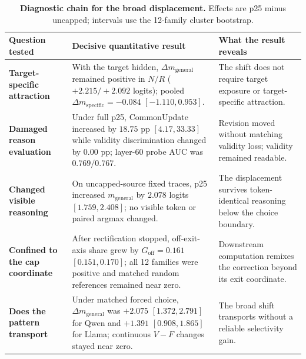 \documentclass[letterpaper]{article} %
\begin{document}
\begin{table}[t]
\centering
\small
\setlength{\tabcolsep}{4pt}
\renewcommand{\arraystretch}{1.12}
\begin{tabular}{@{}L{0.20\textwidth}L{0.38\textwidth}L{0.34\textwidth}@{}}
\toprule
Question tested & Decisive quantitative result & What the result reveals \\
\midrule

\textbf{Target-specific}\newline
\textbf{attraction}
&
With the target hidden, $\Delta m_{\mathrm{general}}$ remained positive in
$N/R$ ($+2.215/+2.092$ logits); pooled
$\Delta m_{\mathrm{specific}}=-0.084$ $[-1.110,0.953]$.
&
The shift does not require target exposure or target-specific attraction.
\\

\addlinespace

\textbf{Damaged reason}\newline
\textbf{evaluation}
&
Under full p25, CommonUpdate increased by $18.75$ pp
$[4.17,33.33]$ while validity discrimination changed by $0.00$ pp;
layer-60 probe AUC was $0.769/0.767$.
&
Revision moved without matching validity loss; validity remained readable.
\\

\addlinespace

\textbf{Changed visible}\newline
\textbf{reasoning}
&
On uncapped-source fixed traces, p25 increased
$m_{\mathrm{general}}$ by $2.078$ logits $[1.759,2.408]$; no visible token or
paired argmax changed.
&
The displacement survives token-identical reasoning below the choice boundary.
\\

\addlinespace

\textbf{Confined to the cap}\newline
\textbf{coordinate}
&
After rectification stopped, off-exit-axis share grew by
$G_{\mathrm{off}}=0.161$ $[0.151,0.170]$; all 12 families were positive and
matched random references remained near zero.
&
Downstream computation remixes the correction beyond its exit coordinate.
\\

\addlinespace

\textbf{Does the pattern}\newline
\textbf{transport}
&
Under matched forced choice, $\Delta m_{\mathrm{general}}$ was
$+2.075$ $[1.372,2.791]$ for Qwen and $+1.391$ $[0.908,1.865]$ for Llama;
continuous $V-F$ changes stayed near zero.
&
The broad shift transports without a reliable selectivity gain.
\\

\bottomrule
\end{tabular}
\caption{\textbf{Diagnostic chain for the broad displacement.} Effects are p25 minus uncapped; intervals use the 12-family cluster bootstrap.}
\label{tab:diagnostic-chain}
\end{table}
\end{document}
